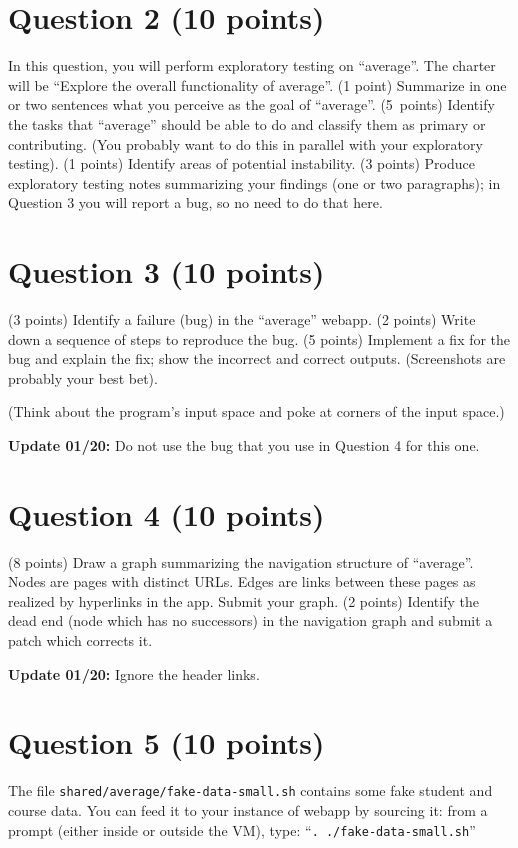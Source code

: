 \documentclass[10pt,hidelinks]{article}
\begin{document}
\section*{Question 2 (10 points)}
In this question, you will perform exploratory testing on ``average''.
The charter will be ``Explore the overall functionality of
average''. (1 point) Summarize in one or two sentences what you
perceive as the goal of ``average''. (5~points) Identify the tasks
that ``average'' should be able to do and classify them as primary or
contributing. (You probably want to do this in parallel with your
exploratory testing). (1 points) Identify areas of potential
instability. (3 points) Produce exploratory testing notes summarizing
your findings (one or two paragraphs); in Question 3 you will report a
bug, so no need to do that here.

\section*{Question 3 (10 points)}
(3 points) Identify a failure (bug) in the ``average'' webapp. (2 points) Write down a sequence of
steps to reproduce the bug. (5 points) Implement a fix for the bug and explain the
fix; show the incorrect and correct outputs. (Screenshots are probably
your best bet).

(Think about the program's input space and poke at corners of the
input space.)

{\bf Update 01/20:} Do not use the bug that you use in Question 4 for this one.

\section*{Question 4 (10 points)}
(8 points) Draw a graph summarizing the navigation structure of ``average''.
Nodes are pages with distinct URLs. Edges are links between these
pages as realized by hyperlinks in the app. Submit your graph.
(2 points) Identify the dead end (node which has no successors) in the navigation
graph and submit a patch which corrects it.

{\bf Update 01/20:} Ignore the header links.

\section*{Question 5 (10 points)}
The file {\tt shared/average/fake-data-small.sh}
contains some fake student and course
data. You can feed it to your instance of webapp by sourcing it: from a prompt 
(either inside or outside the VM),
type: ``\verb+. ./fake-data-small.sh+''
\end{document}
